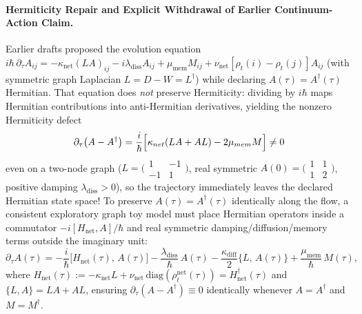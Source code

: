 \paragraph{Hermiticity Repair and Explicit Withdrawal of Earlier Continuum-Action Claim.}
Earlier drafts proposed the evolution equation $i\hbar\,\partial_\tau A_{ij} = -\kappa_{\mathrm{net}}(LA)_{ij} - i\lambda_{\mathrm{diss}}A_{ij} + \mu_{\mathrm{mem}}M_{ij} + \nu_{\mathrm{net}}[\rho_t(i)-\rho_t(j)]A_{ij}$ (with symmetric graph Laplacian $L = D - W = L^\dagger$) while declaring $A(\tau) = A^\dagger(\tau)$ Hermitian. That equation does \emph{not} preserve Hermiticity: dividing by $i\hbar$ maps Hermitian contributions into anti-Hermitian derivatives, yielding the nonzero Hermiticity defect
\begin{equation}
\partial_\tau\bigl(A - A^\dagger\bigr) = \frac{i}{\hbar}\Bigl[\kappa_{\mathrm{net}}(LA + AL) - 2\mu_{\mathrm{mem}} M\Bigr] \ne 0
\label{eq:network_hermiticity_defect}
\end{equation}
even on a two-node graph ($L = \bigl(\begin{smallmatrix}1 & -1\\ -1 & 1\end{smallmatrix}\bigr)$, real symmetric $A(0) = \bigl(\begin{smallmatrix}1 & 1\\ 1 & 2\end{smallmatrix}\bigr)$, positive damping $\lambda_{\mathrm{diss}} > 0$), so the trajectory immediately leaves the declared Hermitian state space! To preserve $A(\tau) = A^\dagger(\tau)$ identically along the flow, a consistent exploratory graph toy model must place Hermitian operators inside a commutator $-i[H_{\mathrm{net}}, A]/\hbar$ and real symmetric damping/diffusion/memory terms outside the imaginary unit:
\begin{equation}
\partial_\tau A(\tau)
= -\frac{i}{\hbar}\bigl[H_{\mathrm{net}}(\tau),\, A(\tau)\bigr]
  - \frac{\lambda_{\mathrm{diss}}}{\hbar}\,A(\tau)
  - \frac{\kappa_{\mathrm{diff}}}{2}\bigl\{L,\, A(\tau)\bigr\}
  + \frac{\mu_{\mathrm{mem}}}{\hbar}\,M(\tau),
\label{eq:discrete_super_coherence}
\end{equation}
where $H_{\mathrm{net}}(\tau) := -\kappa_{\mathrm{net}} L + \nu_{\mathrm{net}}\,\mathrm{diag}(\rho_t^{\mathrm{net}}(\tau)) = H_{\mathrm{net}}^\dagger(\tau)$ and $\{L, A\} = LA + AL$, ensuring $\partial_\tau(A - A^\dagger) \equiv 0$ identically whenever $A = A^\dagger$ and $M = M^\dagger$.

